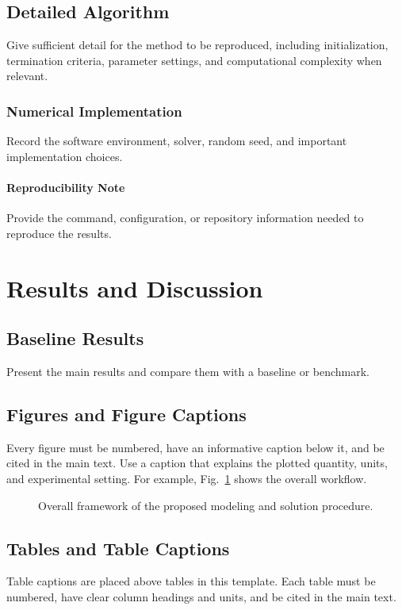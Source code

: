 \documentclass[11pt,a4paper]{article}
\begin{document}
\subsection{Detailed Algorithm}
Give sufficient detail for the method to be reproduced, including initialization,
termination criteria, parameter settings, and computational complexity when relevant.

\subsubsection{Numerical Implementation}
Record the software environment, solver, random seed, and important implementation choices.

\paragraph{Reproducibility Note}
Provide the command, configuration, or repository information needed to reproduce the results.

\section{Results and Discussion}
\subsection{Baseline Results}
Present the main results and compare them with a baseline or benchmark.

\subsection{Figures and Figure Captions}
Every figure must be numbered, have an informative caption below it, and be cited in the
main text. Use a caption that explains the plotted quantity, units, and experimental setting.
For example, Fig.~\ref{fig:overall-framework} shows the overall workflow.

\begin{figure}[H]
  \centering
  \fbox{\rule{0pt}{4cm}\rule{0.82\linewidth}{0pt}}
  \caption{Overall framework of the proposed modeling and solution procedure.}
  \label{fig:overall-framework}
\end{figure}

\subsection{Tables and Table Captions}
Table captions are placed above tables in this template. Each table must be numbered,
have clear column headings and units, and be cited in the main text.
\end{document}
